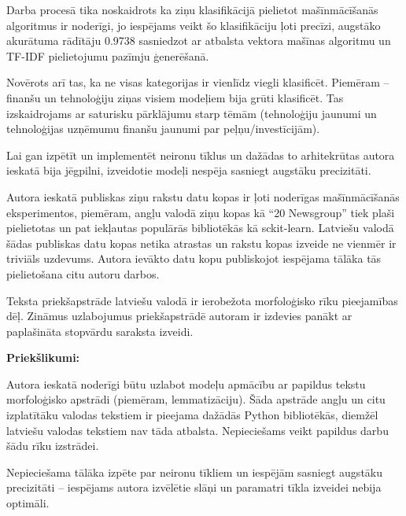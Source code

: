 Darba procesā tika noskaidrots ka ziņu klasifikācijā pielietot mašīnmācīšanās algoritmus ir noderīgi, jo iespējams veikt šo klasifikāciju ļoti precīzi, augstāko akurātuma rādītāju 0.9738 sasniedzot ar atbalsta vektora mašīnas algoritmu un TF-IDF pielietojumu pazīmju ģenerēšanā.

Novērots arī tas, ka ne visas kategorijas ir vienlīdz viegli klasificēt. Piemēram – finanšu un tehnoloģiju ziņas visiem modeļiem bija grūti klasificēt. Tas izskaidrojams ar saturisku pārklājumu starp tēmām (tehnoloģiju jaunumi un tehnoloģijas uzņēmumu finanšu jaunumi par peļņu/investīcijām).

Lai gan izpētīt un implementēt neironu tīklus un dažādas to arhitekrūtas autora ieskatā bija jēgpilni, izveidotie modeļi nespēja sasniegt augstāku precizitāti.

Autora ieskatā publiskas ziņu rakstu datu kopas ir ļoti noderīgas mašīnmācīšanās eksperimentos, piemēram, angļu valodā ziņu kopas kā “20 Newsgroup” tiek plaši pielietotas un pat iekļautas populārās bibliotēkās kā sckit-learn. Latviešu valodā šādas publiskas datu kopas netika atrastas un rakstu kopas izveide ne vienmēr ir triviāls uzdevums. Autora ievākto datu kopu publiskojot iespējama tālāka tās pielietošana citu autoru darbos.

Teksta priekšapstrāde latviešu valodā ir ierobežota morfoloģisko rīku pieejamības dēļ. Zināmus uzlabojumus priekšapstrādē autoram ir izdevies panākt ar paplašināta stopvārdu saraksta izveidi.

\textbf {Priekšlikumi:}

Autora ieskatā noderīgi būtu uzlabot modeļu apmācību ar papildus tekstu morfoloģisko apstrādi (piemēram, lemmatizāciju). Šāda apstrāde angļu un citu izplatītāku valodas tekstiem ir pieejama dažādās Python bibliotēkās, diemžēl latviešu valodas tekstiem nav tāda atbalsta. Nepieciešams veikt papildus darbu šādu rīku izstrādei.

Nepieciešama tālāka izpēte par neironu tīkliem un iespējām sasniegt augstāku precizitāti – iespējams autora izvēlētie slāņi un paramatri tīkla izveidei nebija optimāli.